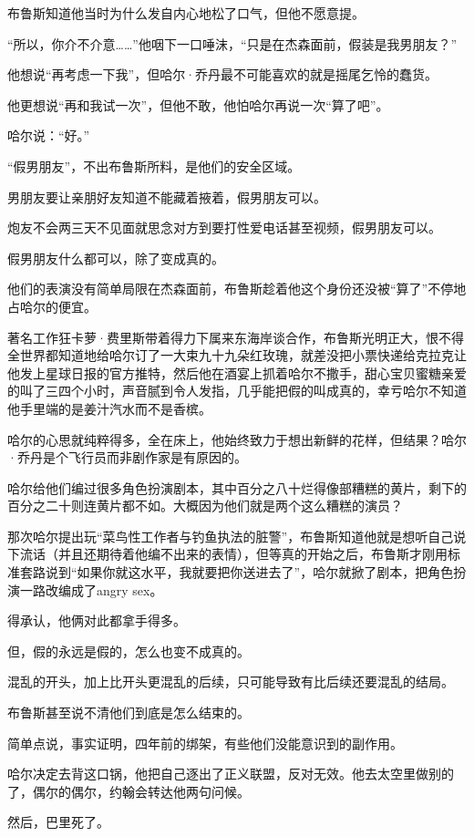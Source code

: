 \documentclass[../main]{subfiles}
\begin{document}
布鲁斯知道他当时为什么发自内心地松了口气，但他不愿意提。

“所以，你介不介意\ldots\ldots”他咽下一口唾沫，“只是在杰森面前，假装是我男朋友？”

他想说“再考虑一下我”，但哈尔·乔丹最不可能喜欢的就是摇尾乞怜的蠢货。

他更想说“再和我试一次”，但他不敢，他怕哈尔再说一次“算了吧”。

哈尔说：“好。”

“假男朋友”，不出布鲁斯所料，是他们的安全区域。

男朋友要让亲朋好友知道不能藏着掖着，假男朋友可以。

炮友不会两三天不见面就思念对方到要打性爱电话甚至视频，假男朋友可以。

假男朋友什么都可以，除了变成真的。

他们的表演没有简单局限在杰森面前，布鲁斯趁着他这个身份还没被“算了”不停地占哈尔的便宜。

著名工作狂卡萝·费里斯带着得力下属来东海岸谈合作，布鲁斯光明正大，恨不得全世界都知道地给哈尔订了一大束九十九朵红玫瑰，就差没把小票快递给克拉克让他发上星球日报的官方推特，然后他在酒宴上抓着哈尔不撒手，甜心宝贝蜜糖亲爱的叫了三四个小时，声音腻到令人发指，几乎能把假的叫成真的，幸亏哈尔不知道他手里端的是姜汁汽水而不是香槟。

哈尔的心思就纯粹得多，全在床上，他始终致力于想出新鲜的花样，但结果？哈尔·乔丹是个飞行员而非剧作家是有原因的。

哈尔给他们编过很多角色扮演剧本，其中百分之八十烂得像部糟糕的黄片，剩下的百分之二十则连黄片都不如。大概因为他们就是两个这么糟糕的演员？

那次哈尔提出玩“菜鸟性工作者与钓鱼执法的脏警”，布鲁斯知道他就是想听自己说下流话（并且还期待着他编不出来的表情），但等真的开始之后，布鲁斯才刚用标准套路说到“如果你就这水平，我就要把你送进去了”，哈尔就掀了剧本，把角色扮演一路改编成了angry
sex。

得承认，他俩对此都拿手得多。

但，假的永远是假的，怎么也变不成真的。

混乱的开头，加上比开头更混乱的后续，只可能导致有比后续还要混乱的结局。

布鲁斯甚至说不清他们到底是怎么结束的。

简单点说，事实证明，四年前的绑架，有些他们没能意识到的副作用。

哈尔决定去背这口锅，他把自己逐出了正义联盟，反对无效。他去太空里做别的了，偶尔的偶尔，约翰会转达他两句问候。

然后，巴里死了。
\end{document}
